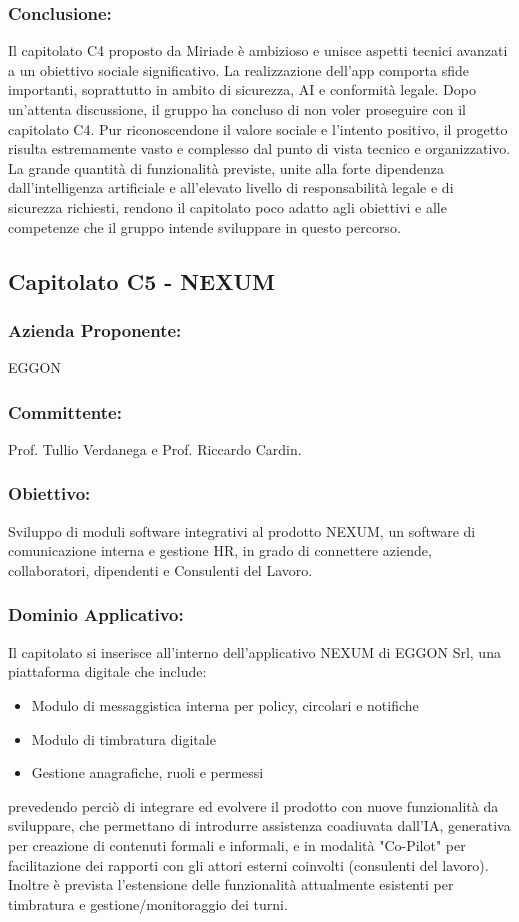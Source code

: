 \documentclass[a4paper,12pt]{article}
\begin{document}
\subsubsection*{Conclusione:}
Il capitolato C4 proposto da Miriade è ambizioso e unisce aspetti tecnici avanzati a un obiettivo sociale significativo.  
La realizzazione dell’app comporta sfide importanti, soprattutto in ambito di sicurezza, AI e conformità legale.
Dopo un’attenta discussione, il gruppo ha concluso di non voler proseguire con il capitolato C4.  
Pur riconoscendone il valore sociale e l’intento positivo, il progetto risulta estremamente vasto e complesso dal punto di vista tecnico e organizzativo.  
La grande quantità di funzionalità previste, unite alla forte dipendenza dall'intelligenza artificiale e all’elevato livello di responsabilità legale e di sicurezza richiesti, rendono il capitolato poco adatto agli obiettivi e alle competenze che il gruppo intende sviluppare in questo percorso.
\vspace{2.0cm}

\subsection{Capitolato C5 - NEXUM}
\subsubsection*{Azienda Proponente:} EGGON
\subsubsection*{Committente:} Prof. Tullio Verdanega e Prof. Riccardo Cardin.
\subsubsection*{Obiettivo:}
Sviluppo di moduli software integrativi al prodotto NEXUM, un software di comunicazione interna e gestione HR, in grado di connettere aziende, collaboratori, dipendenti e Consulenti del Lavoro.
\subsubsection*{Dominio Applicativo:}
Il capitolato si inserisce all'interno dell'applicativo NEXUM di EGGON Srl, una piattaforma digitale che include:
\begin{itemize}
    \item Modulo di messaggistica interna per policy, circolari e notifiche
    \item Modulo di timbratura digitale
    \item Gestione anagrafiche, ruoli e permessi
\end{itemize}
prevedendo perciò di integrare ed evolvere il prodotto con nuove funzionalità da sviluppare, che permettano di introdurre assistenza coadiuvata dall'IA, generativa per creazione di contenuti formali e informali, e in modalità "Co-Pilot" per facilitazione dei rapporti con gli attori esterni coinvolti (consulenti del lavoro). Inoltre è prevista l'estensione delle funzionalità attualmente esistenti per timbratura e gestione/monitoraggio dei turni.
 
\end{document}
